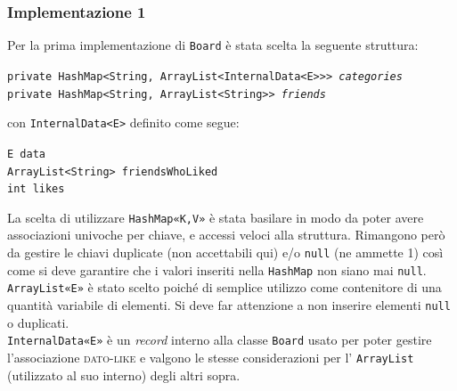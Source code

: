 \documentclass[10pt, a4paper]{article}
\begin{document}
\subsubsection{Implementazione 1}
Per la prima implementazione di \texttt{Board} è stata scelta la seguente struttura: 
\begin{center}
\texttt{private HashMap<String, ArrayList<InternalData<E>>> \emph{categories}\\
	private HashMap<String, ArrayList<String>> \emph{friends}}
\end{center}
con \texttt{InternalData<E>}  definito come segue: 
\begin{center}
\texttt{E data\\
		ArrayList<String> friendsWhoLiked\\
		int likes}
\end{center}
La scelta di utilizzare \texttt{HashMap«K,V»} è stata basilare in modo da poter avere associazioni univoche per chiave, e accessi veloci alla struttura. 
Rimangono però da gestire le chiavi duplicate (non accettabili qui) e/o \texttt{null} (ne ammette 1) così come si deve garantire che i valori inseriti nella \texttt{HashMap} non siano mai \texttt{null}. \\
\texttt{ArrayList«E»} è stato scelto poiché di semplice utilizzo come contenitore di una quantità variabile di elementi. Si deve far attenzione a non inserire elementi \texttt{null} o duplicati.\\
\texttt{InternalData«E»} è un \textit{record} interno alla classe \texttt{Board} usato per poter gestire l'associazione \textsc{dato-like} e valgono le stesse considerazioni per l' \texttt{ArrayList} (utilizzato al suo interno) degli altri sopra.
\end{document}
